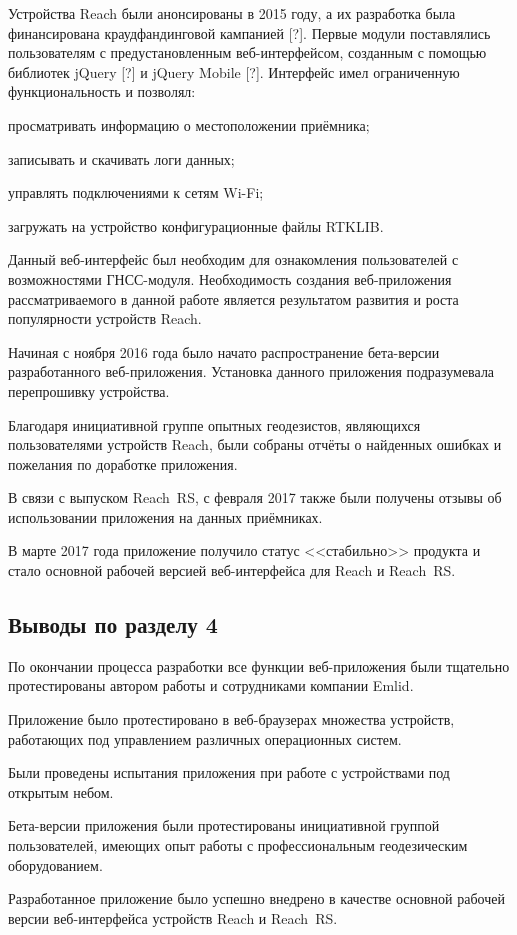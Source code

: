 Устройства Reach были анонсированы в 2015 году, а их разработка была финансирована краудфандинговой кампанией [?]. Первые модули поставлялись пользователям с предустановленным веб-интерфейсом, созданным с помощью библиотек jQuery [?] и jQuery Mobile [?]. Интерфейс имел ограниченную функциональность и позволял:
\begin{dashitemize}
  \item просматривать информацию о местоположении приёмника;
  \item записывать и скачивать логи данных;
  \item управлять подключениями к сетям Wi-Fi;
  \item загружать на устройство конфигурационные файлы RTKLIB.
\end{dashitemize}

Данный веб-интерфейс был необходим для ознакомления пользователей с возможностями ГНСС-модуля. Необходимость создания веб-приложения рассматриваемого в данной работе является результатом развития и роста популярности устройств Reach.

Начиная с ноября 2016 года было начато распространение бета-версии разработанного веб-приложения. Установка данного приложения подразумевала перепрошивку устройства.

Благодаря инициативной группе опытных геодезистов, являющихся пользователями устройств Reach, были собраны отчёты о найденных ошибках и пожелания по доработке приложения.

В связи с выпуском Reach~RS, с февраля 2017 также были получены отзывы об использовании приложения на данных приёмниках.

В марте 2017 года приложение получило статус <<стабильно>> продукта и стало основной рабочей версией веб-интерфейса для Reach и Reach~RS.



\subsection{Выводы по разделу 4}

\begin{dashitemize}
  \item По окончании процесса разработки все функции веб-приложения были тщательно протестированы автором работы и сотрудниками компании Emlid.
  \item Приложение было протестировано в веб-браузерах множества устройств, работающих под управлением различных операционных систем.
  \item Были проведены испытания приложения при работе с устройствами под открытым небом.
  \item Бета-версии приложения были протестированы инициативной группой пользователей, имеющих опыт работы с профессиональным геодезическим оборудованием.
  \item Разработанное приложение было успешно внедрено в качестве основной рабочей версии веб-интерфейса устройств Reach и Reach~RS.
\end{dashitemize}

\newpage